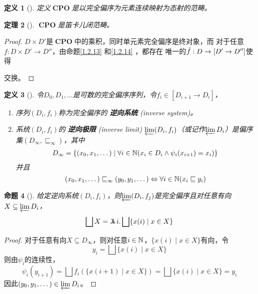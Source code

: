 \documentclass[11pt]{article}
\DeclareMathOperator{\CPO}{\textbf{CPO}}
\newtheorem{theorem}{定理}[section]
\newtheorem{proposition}[theorem]{命题}
\newtheorem{definition}[theorem]{定义}
\begin{document}
\begin{definition}[]
定义\(\CPO\)是以完全偏序为元素连续映射为态射的范畴。
\end{definition}

\begin{theorem}[]
\(\CPO\)是笛卡儿闭范畴。
\end{theorem}

\begin{proof}
\(D\times D'\)是\(\CPO\)中的乘积，同时单元素完全偏序是终对象，而
对于任意\(f:D\times D'\to D''\)，由命题\ref{1.2.13} 和\ref{1.2.14} ，都存在
唯一的\(\hat{f}:D\to[D'\to D'']\)使得
\begin{center}\end{center}
交换。
\end{proof}

\begin{definition}[]
令\(D_0,D_1,\dots\)是可数的完全偏序序列，令\(f_i\in[D_{i+1}\to D_i]\)，
\begin{enumerate}
\item 序列\((D_i,f_i)\)称为完全偏序的 \textbf{逆向系统} (inverse system)。
\item 系统\((D_i,f_i)\)的 \textbf{逆向极限} (inverse limit) \(\varprojlim(D_i,f_i)\)（或记作\(\varprojlim D_i\)）是偏序集\((D_\infty,\sqsubseteq_\infty)\)，其中
\begin{align*}
D_\infty=\{(x_0,x_1,\dots)\mid\forall i\in\mathbb{N}(x_i\in D_i\wedge\psi_i(x_{i+1})=x_i)\}
\end{align*}
并且
\begin{equation*}
(x_0,x_1,\dots)\sqsubseteq_\infty(y_0,y_1,\dots)\Leftrightarrow\forall i\in\mathbb{N}(x_i\sqsubseteq y_i)
\end{equation*}
\end{enumerate}
\end{definition}

\begin{proposition}[]
给定逆向系统\((D_i,f_i)\)，则\(\varprojlim(D_i,f_j)\)是完全偏序且对任意有向\(X\subseteq\varprojlim D_i\)，
\begin{equation*}
\bigsqcup X=\metalambda i.\bigsqcup\{x(i)\mid x\in X\}
\end{equation*}
\end{proposition}

\begin{proof}
对于任意有向\(X\subseteq D_\infty\)，则对任意\(i\in\mathbb{N}\)，\(\{x(i)\mid x\in X\}\)有向，令
\begin{equation*}
y_i=\bigsqcup\{x(i)\mid x\in X\}
\end{equation*}
则由\(\psi_i\)的连续性，
\begin{equation*}
\psi_i(y_{i+1})=\bigsqcup f_i(\{x(i+1)\mid x\in X\})=\bigsqcup\{x(i)\mid x\in X\}=y_i
\end{equation*}
因此\((y_0,y_1,\dots)\in \varprojlim D_i\)。
\end{proof}
\end{document}

